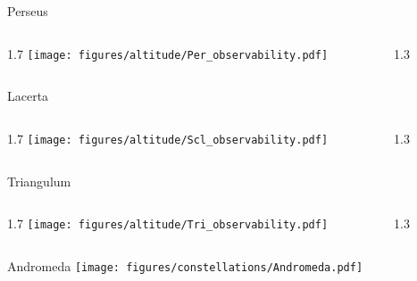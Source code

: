 \documentclass[final]{beamer}
\newlength{\colwidth}
\begin{document}
\begin{frame}[t]{}
  \Large{Perseus}
  \begin{columns}[T]
    \begin{column}{1.7\colwidth}
      \centering
      \texttt{[image: figures/altitude/Per\_observability.pdf]}
    \end{column}
    \begin{column}{1.3\colwidth}
      \Large
      
    \end{column}
  \end{columns}

  \Large{Lacerta}
  \begin{columns}[T]
    \begin{column}{1.7\colwidth}
      \centering
      \texttt{[image: figures/altitude/Scl\_observability.pdf]}
    \end{column}
    \begin{column}{1.3\colwidth}
      \Large
      
    \end{column}
  \end{columns}

  \Large{Triangulum}
  \begin{columns}[T]
    \begin{column}{1.7\colwidth}
      \centering
      \texttt{[image: figures/altitude/Tri\_observability.pdf]}
    \end{column}
    \begin{column}{1.3\colwidth}
      \Large
      
    \end{column}
  \end{columns}
\end{frame}


\begin{frame}[t]{\LARGE Andromeda}
  \centering
  \texttt{[image: figures/constellations/Andromeda.pdf]}
\end{frame}

\end{document}
